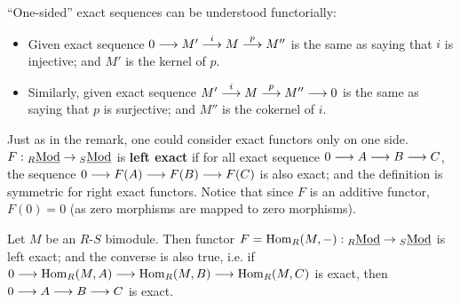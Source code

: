 \documentclass{article}
\begin{document}
\begin{remark}
    ``One-sided'' exact sequences can be understood functorially:
    \begin{itemize}
        \item Given exact sequence $0 \longrightarrow M' \overset{i}{\longrightarrow} M \overset{p}{\longrightarrow} M''$ is the same as saying that $i$ is injective; and $M'$ is the kernel of $p$.
        \item Similarly, given exact sequence $M' \overset{i}{\longrightarrow} M \overset{p}{\longrightarrow} M'' \longrightarrow 0$ is the same as saying that $p$ is surjective; and $M''$ is the cokernel of $i$.
    \end{itemize}
\end{remark}

\begin{definition}
    Just as in the remark, one could consider exact functors only on one side. $F: {}_{R}\underline{\textup{Mod}} \to {}_{S}\underline{\textup{Mod}}$ is \textbf{left exact} if for all exact sequence $0 \longrightarrow A \longrightarrow B \longrightarrow C$, the sequence $0 \longrightarrow F(A) \longrightarrow F(B) \longrightarrow F(C)$ is also exact; and the definition is symmetric for right exact functors. Notice that since $F$ is an additive functor, $F(0) = 0$ (as zero morphisms are mapped to zero morphisms). 
\end{definition}

\begin{proposition}\label{prop:Hom(M,-) left exact}
    Let $M$ be an $R$-$S$ bimodule. Then functor $F = \mathrm{Hom}_R(M, -): {}_{R}\underline{\textup{Mod}} \to {}_{S}\underline{\textup{Mod}}$ is left exact; and the converse is also true, i.e. if $0 \longrightarrow \mathrm{Hom}_R(M, A) \longrightarrow \mathrm{Hom}_R(M, B) \longrightarrow \mathrm{Hom}_R(M, C)$ is exact, then $0 \longrightarrow A \longrightarrow B \longrightarrow C$ is exact.
\end{proposition}
\end{document}
